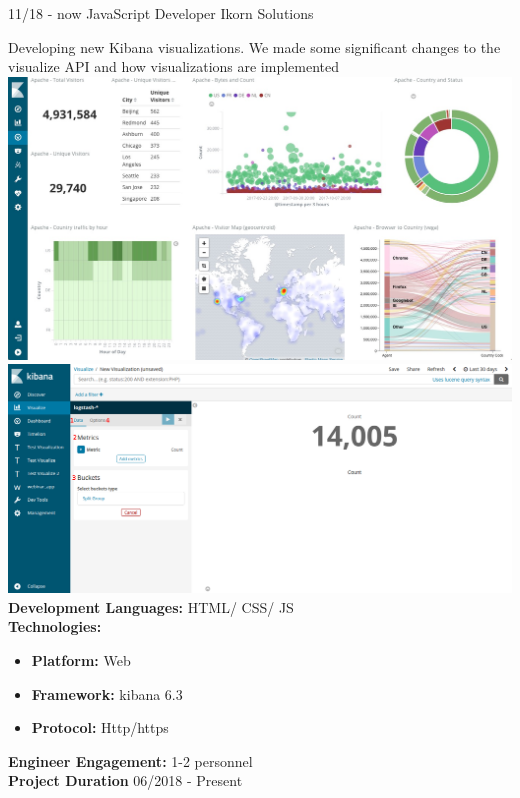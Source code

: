 \documentclass[]{friggeri-cv}
\begin{document}
\begin{entrylist}
  \entry
    {11/18 - now}
    {JavaScript Developer}
    {Ikorn Solutions}
    {Developing new Kibana visualizations. We made some significant changes to the visualize API and how visualizations are implemented\\

	\includegraphics[scale=0.08]{img/kibana_01.jpg} \hspace{2cm}
	\includegraphics[scale=0.1]{img/kibana.png}\\
	
	\textbf{Development Languages:} HTML/ CSS/ JS~\\
	 \textbf{Technologies:}~
			\begin{itemize}
				\item \textbf{Platform:}  Web
				\item \textbf{Framework:} kibana 6.3
				\item \textbf{Protocol:} Http/https
			\end{itemize}
	 \textbf{Engineer Engagement:} 1-2 personnel\\
	 \textbf{Project Duration} 06/2018 - Present~
     }
\end{entrylist}
\end{document}

